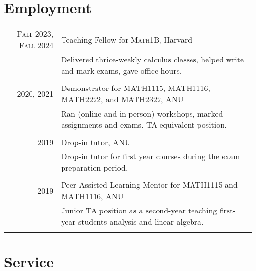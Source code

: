 \documentclass[a4paper,12pt]{article} %
\begin{document}
\section{Employment}

\begin{tabular}{r|p{12cm}}

\textsc{Fall 2023, Fall 2024} & Teaching Fellow for \textsc{Math1B}, Harvard \emph{}\\
& \footnotesize{Delivered thrice-weekly calculus classes, helped write and mark exams, gave office hours.}\\
\multicolumn{2}{c}{} \\


\textsc{2020, 2021} & Demonstrator for \textsc{MATH1115, MATH1116, MATH2222}, and \textsc{MATH2322}, ANU \emph{}\\
& \footnotesize{Ran (online and in-person) workshops, marked assignments and exams. TA-equivalent position.}\\
\multicolumn{2}{c}{} \\


\textsc{2019} & Drop-in tutor, ANU \emph{}\\
& \footnotesize{Drop-in tutor for first year courses during the exam preparation period.}\\
\multicolumn{2}{c}{} \\


\textsc{2019} & Peer-Assisted Learning Mentor for \textsc{MATH1115} and \textsc{MATH1116}, ANU \emph{}\\
& \footnotesize{Junior TA position as a second-year teaching first-year students analysis and linear algebra.}\\
\multicolumn{2}{c}{}

\end{tabular}

\section{Service}
\end{document}
